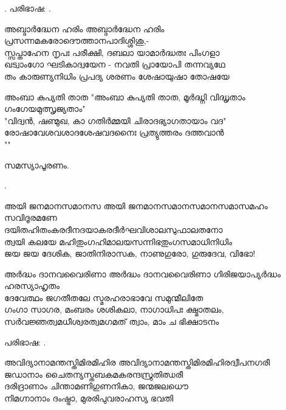 \begin{enumerate}

.
പരിഭാഷ: .

\begin{slokam}{\VSv}{\CN}{അബ്ദാര്‍ദ്ധേന ഹരിം}
അബ്ദാര്‍ദ്ധേന ഹരിം പ്രസന്നമകരോദൌത്താനപാദിശ്ശിശു,-\\
സ്സപ്താഹേന നൃപഃ പരീക്ഷി, ദബലാ യാമാര്‍ദ്ധതഃ പിംഗളാ\\
ഖട്വാംഗോ ഘടികാദ്വയേന - നവതി പ്രായോപി തന്നവ്യഥേ\\
തം കാരുണ്യനിധിം പ്രപദ്യ ശരണം ശേഷായുഷാ തോഷയേ
\end{slokam}



\begin{slokam}{\VSv}{\Unk}{അംബാ കുപ്യതി താത}
 "അംബാ കുപ്യതി താത, മൂര്‍ദ്ധ്നി വിദ്ധൃതാം ഗംഗേയമുത്സൃജ്യതാം"\\
"വിദ്വന്‍, ഷണ്മുഖ, കാ ഗതിര്‍മ്മയി ചിരാദഭ്യാഗതായാം വദ"\\
രോഷാവേശവശാദശേഷവദനൈഃ പ്രത്യുത്തരം ദത്തവാന്‍\\
""
\end{slokam}


സമസ്യാപൂരണം.

. 

\begin{slokam}{\VOth}{\NDK}{അയി ജനമാനസമാനസ}
അയി ജനമാനസമാനസമാനസമാസമഹം സവിദൂരമണേ\\
ദയിതഹിതംകരദീനദയാകരദീർഘവിശാലസുഫാലതനോ\\
ത്വയി കലയേ മഹിതുംഗഹിമാലയസന്നിഭതുംഗസമാധിനിധിം\\
ജയ ജയ ദേശിക, ജാതിനിരാസക, നാണുഗുരോ, ഗുരുദേവ, വിഭോ! 
\end{slokam}


\begin{slokam}{\VSv}{\KD}{അർദ്ധം ദാനവവൈരിണാ}
അര്‍ദ്ധം ദാനവവൈരിണാ ഗിരിജയാപ്യര്‍ദ്ധം ഹരസ്യാഹൃതം\\
ദേവേത്ഥം ജഗതീതലേ സ്മരഹരാഭാവേ സമുന്മീലിതേ\\
ഗംഗാ സാഗര, മംബരം ശശികലാ, നാഗാധിപഃ ക്ഷ്മാതലം,\\
സര്‍വജ്ഞത്വമധീശ്വരത്വമഗമത് ത്വാം, മാം ച ഭിക്ഷാടനം 
\end{slokam}


പരിഭാഷ:  .


\begin{slokam}{\VSk}{\Sank}{അവിദ്യാനാമന്തസ്തിമിരമിഹിര}
അവിദ്യാനാമന്തസ്തിമിരമിഹിരദ്വീപനഗരീ\\
ജഡാനാം ചൈതന്യസ്തബകമകരന്ദസ്രുതിഝരീ\\
ദരിദ്രാണാം ചിന്താമണിഗുണനികാ, ജന്മജലധൌ\\
നിമഗ്നാനാം ദംഷ്ട്രാ, മുരരിപുവരാഹസ്യ ഭവതി
\end{slokam}


\end{enumerate}
